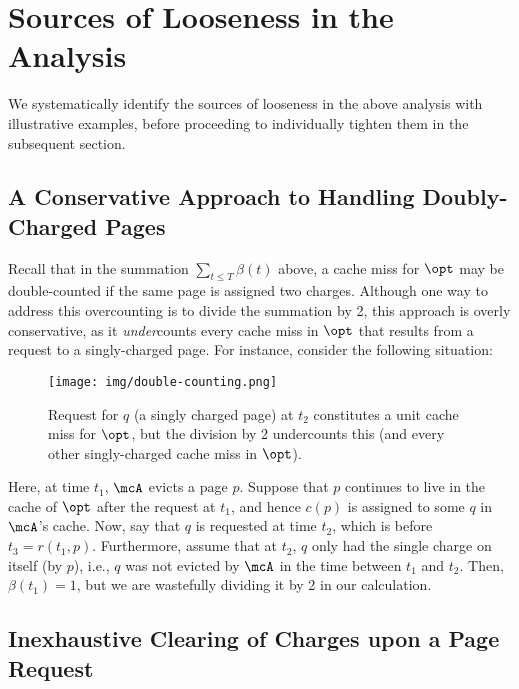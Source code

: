 \documentclass[11pt]{article}
\begin{document}
 \section{Sources of Looseness in the Analysis}
\label{sec:looseness}
We systematically identify the sources of looseness in the above analysis with illustrative examples, before proceeding to individually tighten them in the subsequent section.

\subsection{A Conservative Approach to Handling Doubly-Charged Pages}
\label{sec:looseness-double-counting}

Recall that in the summation $\sum_{t \le T} \beta(t)$ above, a cache miss for $\opt$ may be double-counted if the same page is assigned two charges. Although one way to address this overcounting is to divide the summation by 2, this approach is overly conservative, as it \textit{under}counts every cache miss in $\opt$ that results from a request to a singly-charged page. For instance, consider the following situation:
\begin{figure}[H]
    \centering
    \texttt{[image: img/double-counting.png]}
    \caption{Request for $q$ (a singly charged page) at $t_2$ constitutes a unit cache miss for $\opt$, but the division by 2 undercounts this (and every other singly-charged cache miss in $\opt$).}
    \label{fig:double-counting}
\end{figure}
Here, at time $t_1$, $\mcA$ evicts a page $p$. Suppose that $p$ continues to live in the cache of $\opt$ after the request at $t_1$, and hence $c(p)$ is assigned to some $q$ in $\mcA$'s cache. Now, say that $q$ is requested at time $t_2$, which is before $t_3=r(t_1, p)$. Furthermore, assume that at $t_2$, $q$ only had the single charge on itself (by $p$), i.e., $q$ was not evicted by $\mcA$ in the time between $t_1$ and $t_2$. Then, $\beta(t_1)=1$, but we are wastefully dividing it by 2 in our calculation.

\subsection{Inexhaustive Clearing of Charges upon a Page Request}
\label{sec:looseness-uncleared-charges}
\end{document}

